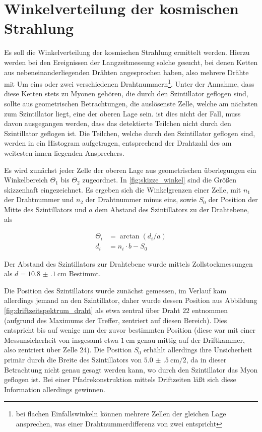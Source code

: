 \chapter{Winkelverteilung der kosmischen Strahlung}
Es soll die Winkelverteilung der kosmischen Strahlung ermittelt werden. Hierzu werden bei den Ereignissen der Langzeitmessung solche gesucht, bei denen Ketten aus nebeneinanderliegenden Drähten angesprochen haben, also mehrere Drähte mit Um eins oder zwei verschiedenen Drahtnummern\footnote{bei flachen Einfallswinkeln können mehrere Zellen der gleichen Lage ansprechen, was einer Drahtnummerdifferenz von zwei entspricht}.
Unter der Annahme, dass diese Ketten stets zu Myonen gehören, die durch den Szintillator geflogen sind, sollte aus geometrischen Betrachtungen, die auslösenste Zelle, welche am nächsten zum Szintillator liegt, eine der oberen Lage sein. ist dies nicht der Fall, muss davon ausgegangen werden, dass das detektierte Teilchen nicht durch den Szintillator geflogen ist. Die Teilchen, welche durch den Szintillator geflogen sind, werden in ein Histogram aufgetragen, entsprechend der Drahtzahl des am weitesten innen liegenden Ansprechers.

Es wird zunächst jeder Zelle der oberen Lage aus geometrischen überlegungen ein Winkelbereich $\Theta_1$ bis $\Theta_2$ zugeordnet. In \ref{fig:skizze_winkel} sind die Größen skizzenhaft eingezeichnet. Es ergeben sich die Winkelgrenzen einer Zelle, mit $n_1$ der Drahtnummer und $n_2$ der Drahtnummer minus eins, sowie $S_0$ der Position der Mitte des Szintillators und $a$ dem Abstand des Szintillators zu der Drahtebene, als

\begin{align}
	\Theta_i &= \arctan(d_i / a)\\
	d_i &= n_i \cdot b - S_0
\end{align}

Der Abstand des Szintillators zur Drahtebene wurde mittels Zollstockmessungen als $d = \SI{10.8(1)}{\centi\meter}$ Bestimmt.

Die Position des Szintillators wurde zunächst gemessen, im Verlauf kam allerdings jemand an den Szintillator, daher wurde dessen Position aus Abbildung \ref{fig:driftzeitspektrum_draht} als etwa zentral über Draht $22$ entnommen (aufgrund des Maximums der Treffer, zentriert auf diesen Bereich). Dies entspricht bis auf wenige $\unit{\milli\meter}$ der zuvor bestimmten Position (diese war mit einer Messunsicherheit von insgesamt etwa $\SI{1}{\centi\meter}$ genau mittig auf der Driftkammer, also zentriert über Zelle 24). Die Position $S_0$ erhählt allerdings ihre Unsicherheit primär durch die Breite des Szintillators von $\SI{5.0(5)}{\centi\meter} / 2$, da in dieser Betrachtung nicht genau gesagt werden kann, wo durch den Szintillator das Myon geflogen ist. Bei einer Pfadrekonstruktion mittels Driftzeiten läßt sich diese Information allerdings gewinnen.

